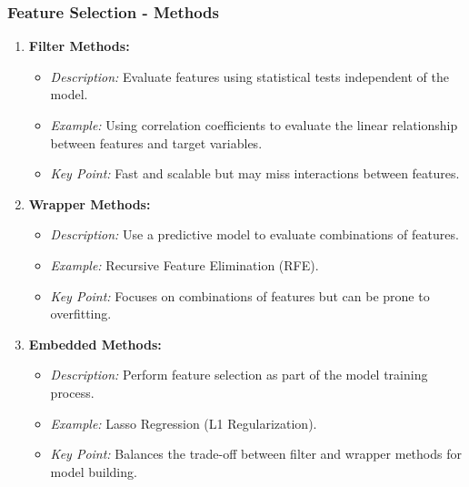 \documentclass[aspectratio=169]{beamer}
\begin{document}
\begin{frame}[fragile]
    \frametitle{Feature Selection - Methods}
    \begin{enumerate}
        \item \textbf{Filter Methods:}
        \begin{itemize}
            \item \textit{Description:} Evaluate features using statistical tests independent of the model.
            \item \textit{Example:} Using correlation coefficients to evaluate the linear relationship between features and target variables.
            \item \textit{Key Point:} Fast and scalable but may miss interactions between features.
        \end{itemize}
        
        \item \textbf{Wrapper Methods:}
        \begin{itemize}
            \item \textit{Description:} Use a predictive model to evaluate combinations of features. 
            \item \textit{Example:} Recursive Feature Elimination (RFE).
            \item \textit{Key Point:} Focuses on combinations of features but can be prone to overfitting.
        \end{itemize}
        
        \item \textbf{Embedded Methods:}
        \begin{itemize}
            \item \textit{Description:} Perform feature selection as part of the model training process.
            \item \textit{Example:} Lasso Regression (L1 Regularization).
            \item \textit{Key Point:} Balances the trade-off between filter and wrapper methods for model building.
        \end{itemize}
    \end{enumerate}
\end{frame}
\end{document}
